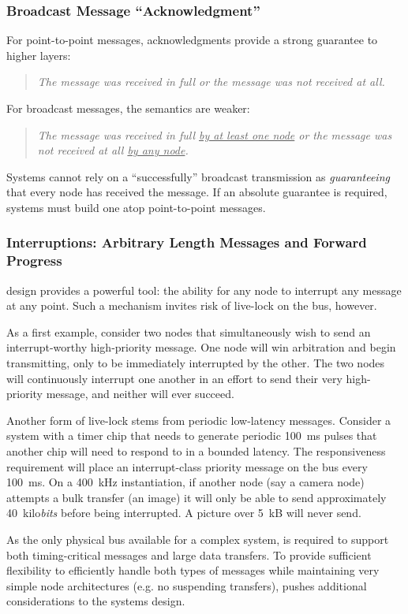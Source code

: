 \subsubsection{Broadcast Message ``Acknowledgment''}
For point-to-point messages, \bus acknowledgments provide a strong guarantee
to higher layers:
%
\begin{quote}
\textit{The message was received in full or the message was not received at
all.}
\end{quote}
%
For broadcast messages, the \bus semantics are weaker:
%
\begin{quote}
\textit{The message was received in full \uline{by at least one node} or the
message was not received at all \uline{by any node}.}
\end{quote}
%
Systems cannot rely on a ``successfully''
broadcast transmission as {\em guaranteeing} that every node has received the
message.  If an absolute guarantee is required, systems must build one atop
point-to-point messages.


\subsubsection{Interruptions: Arbitrary Length Messages and Forward Progress}
\bus design provides a powerful tool: the ability for any node to interrupt
any message at any point. Such a mechanism invites risk of live-lock on the
bus, however.

As a first example, consider two nodes that simultaneously wish to send an
interrupt-worthy high-priority message. One node will win arbitration and
begin transmitting, only to be immediately interrupted by the other. The two
nodes will continuously interrupt one another in an effort to send their very
high-priority message, and neither will ever succeed.

Another form of live-lock stems from periodic low-latency messages. Consider a
system with a timer chip that needs to generate periodic 100~ms pulses that
another chip will need to respond to in a bounded latency. The responsiveness
requirement will place an interrupt-class priority message on the bus every
100~ms. On a 400~kHz instantiation, if another node (say a camera node)
attempts a bulk transfer (an image) it will only be able to send approximately
40~kilo{\em bits} before being interrupted. A picture over 5~kB will never
send.

As the only physical bus available for a complex system, \bus is required to
support both timing-critical messages and large data transfers. To provide
sufficient flexibility to efficiently handle both types of messages while
maintaining very simple node architectures (e.g. no suspending transfers),
\bus pushes additional considerations to the systems design.

